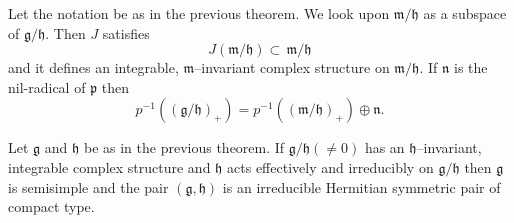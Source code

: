 \documentclass[10pt,a4paper]{amsart}
\begin{document}
\begin{corollary}
\label{BasicObs} Let the notation be as in the previous theorem. We look upon
$\mathfrak{m}/\mathfrak{h}$ as a subspace of $\mathfrak{g}/\mathfrak{h}$. Then $J$ satisfies
\[
J(\mathfrak{m}/\mathfrak{h})\subset\, \mathfrak{m}/\mathfrak{h}
\]
and it defines an integrable, $\mathfrak{m}$--invariant complex structure on
$\mathfrak{m}/\mathfrak{h}.$ If $\mathfrak{n}$ is the nil-radical of
$\mathfrak{p}$ then
\[
p^{-1} ((\mathfrak{g}/\mathfrak{h})_+)=p^{-1}((\mathfrak{m}/\mathfrak{h}%
)_{+})\oplus\mathfrak{n}\text{.}%
\]
\end{corollary}

\begin{theorem}
\label{LieAlgIrr}
Let $\mathfrak{g}$ and $\mathfrak{h}$ be as in the previous theorem. If
$\mathfrak{g}/\mathfrak{h}(\ne 0)$ has an $\mathfrak{h}$--invariant, integrable
complex structure and $\mathfrak{h}$ acts effectively and irreducibly on $%
\mathfrak{g}/\mathfrak{h}$ then $\mathfrak{g}$ is semisimple and the pair $(%
\mathfrak{g},\mathfrak{h})$ is an irreducible Hermitian symmetric pair of
compact type.
\end{theorem}
\end{document}

